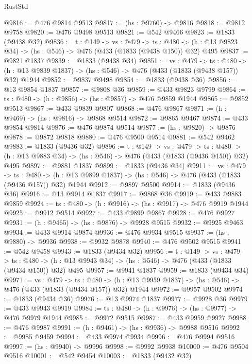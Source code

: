 \begin{lexlean}{RustStd}
\begin{coremodule}
@9816 := @476 @9814 @9513
@9817 := (hs : @9760) -> @9816
@9818 := @9812 @9758
@9820 := @476 @9498 @9513
@9821 := @542 @9466
@9823 := @1833 (@9438 @32)
@9836 := {t : @149} ->
  {vs : @479} ->
  {ts : @480} -> (h : @13 @9823 @34) -> (hs : @546) -> @476 (@433 (@1833 (@9438 @150)) @32) @495
@9837 := @9821 @1837
@9839 := @1833 (@9438 @34)
@9851 := {vs : @479} ->
  {ts : @480} -> (h : @13 @9839 @1837) -> (hs : @546) -> @476 (@433 (@1833 (@9438 @157)) @32) @1944
@9852 := @9837 @9498
@9854 := @1833 (@9438 @36)
@9856 := @13 @9854 @1837
@9857 := @9808 @36
@9859 := @433 @9823 @9799
@9864 := {ts : @480} -> (h : @9856) -> (hs : @9857) -> @476 @9859 @1944
@9865 := @9852 @9513
@9867 := @433 @9839 @9807
@9868 := @476 @9867
@9871 := (h : @9469) -> (hs : @9816) -> @9868 @9514
@9872 := @9865 @9467
@9874 := @433 @9854 @9814
@9876 := @476 @9874 @9514
@9877 := (hs : @9820) -> @9876
@9878 := @9872 @9818
@9880 := @476 @9500 @9514
@9881 := @542 @9462
@9883 := @1833 (@9436 @32)
@9896 := {t : @149} ->
  {vs : @479} ->
  {ts : @480} -> (h : @13 @9883 @34) -> (hs : @546) -> @476 (@433 (@1833 (@9436 @150)) @32) @495
@9897 := @9881 @1837
@9899 := @1833 (@9436 @34)
@9911 := {vs : @479} ->
  {ts : @480} -> (h : @13 @9899 @1837) -> (hs : @546) -> @476 (@433 (@1833 (@9436 @157)) @32) @1944
@9912 := @9897 @9500
@9914 := @1833 (@9436 @36)
@9916 := @13 @9914 @1837
@9917 := @9868 @36
@9919 := @433 @9883 @9859
@9924 := {ts : @480} -> (h : @9916) -> (hs : @9917) -> @476 @9919 @1944
@9925 := @9912 @9514
@9927 := @433 @9899 @9867
@9928 := @476 @9927
@9931 := (h : @9465) -> (hs : @9876) -> @9928 @9515
@9932 := @9925 @9463
@9934 := @433 @9914 @9874
@9936 := @476 @9934 @9515
@9937 := (hs : @9880) -> @9936
@9938 := @9932 @9878
@9940 := @476 @9502 @9515
@9941 := @542 @9458
@9943 := @1833 (@9434 @32)
@9956 := {t : @149} ->
  {vs : @479} ->
  {ts : @480} -> (h : @13 @9943 @34) -> (hs : @546) -> @476 (@433 (@1833 (@9434 @150)) @32) @495
@9957 := @9941 @1837
@9959 := @1833 (@9434 @34)
@9971 := {vs : @479} ->
  {ts : @480} -> (h : @13 @9959 @1837) -> (hs : @546) -> @476 (@433 (@1833 (@9434 @157)) @32) @1944
@9972 := @9957 @9502
@9974 := @1833 (@9434 @36)
@9976 := @13 @9974 @1837
@9977 := @9928 @36
@9979 := @433 @9943 @9919
@9984 := {ts : @480} -> (h : @9976) -> (hs : @9977) -> @476 @9979 @1944
@9985 := @9972 @9515
@9987 := @433 @9959 @9927
@9988 := @476 @9987
@9991 := (h : @9461) -> (hs : @9936) -> @9988 @9516
@9992 := @9985 @9459
@9994 := @433 @9974 @9934
@9996 := @476 @9994 @9516
@9997 := (hs : @9940) -> @9996
@9998 := @9992 @9938
@10000 := @476 @9504 @9516
@10001 := @542 @9454
@10003 := @1833 (@9432 @32)

\end{coremodule}
\end{lexlean}
